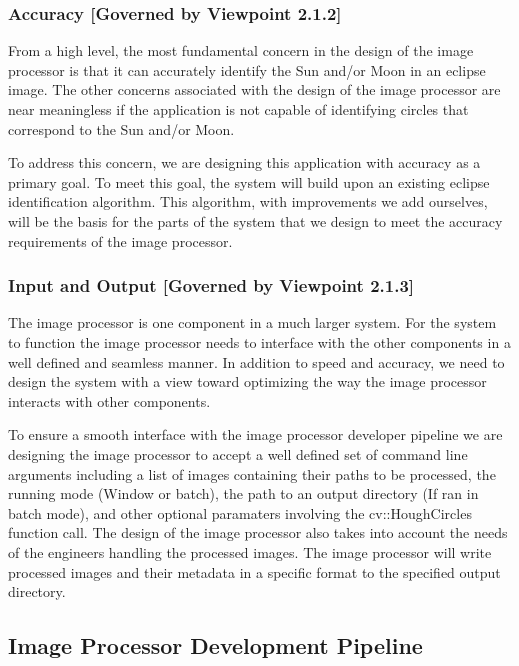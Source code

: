 \documentclass[10pt, onecolumn, draftclsnofoot, letterpaper, compsoc]{IEEEtran}
\begin{document}
\subsubsection{Accuracy [Governed by Viewpoint 2.1.2]}

From a high level, the most fundamental concern in the design of the image
processor is that it can accurately identify the Sun and/or Moon in an eclipse
image. The other concerns associated with the design of the image processor
are near meaningless if the application is not capable of identifying circles
that correspond to the Sun and/or Moon.

To address this concern, we are designing this application with accuracy as a
primary goal. To meet this goal, the system will build upon an existing
eclipse identification algorithm. This algorithm, with improvements we add
ourselves, will be the basis for the parts of the system that we design to
meet the accuracy requirements of the image processor.\\

\subsubsection{Input and Output [Governed by Viewpoint 2.1.3]}

The image processor is one component in a much larger system. For the system to
function the image processor needs to interface with the other components in a
well defined and seamless manner. In addition to speed and accuracy, we need to
design the system with a view toward optimizing the way the image processor
interacts with other components.

To ensure a smooth interface with the image processor developer pipeline we
are designing the image processor to accept a well defined set of command line
arguments including a list of images containing their paths to be processed,
the running mode (Window or batch), the path to an output directory (If ran in
batch mode), and other optional paramaters involving the cv::HoughCircles
function call. The design of the image processor also takes into account the
needs of the engineers handling the processed images. The image processor will
write processed images and their metadata in a specific format to the
specified output directory. \\

\subsection{Image Processor Development Pipeline}
\end{document}
